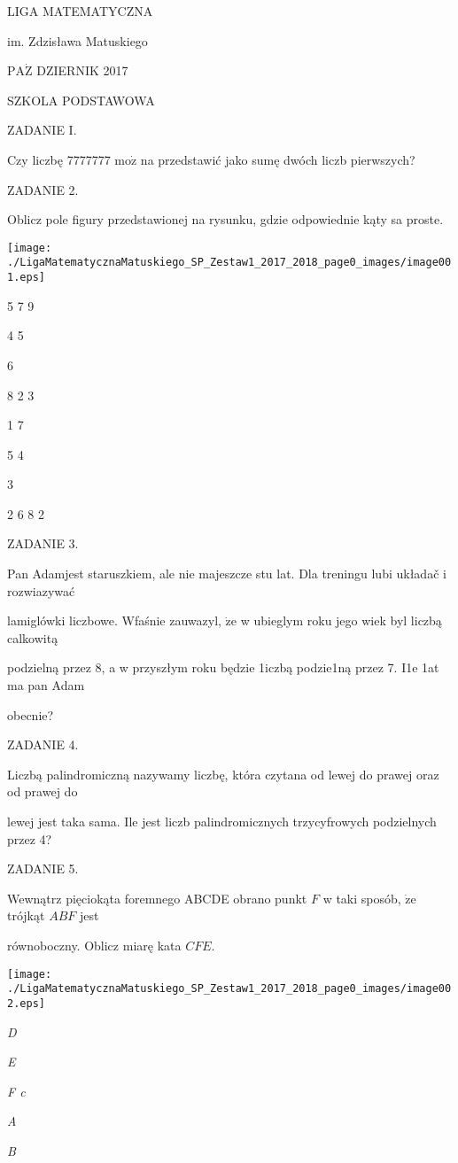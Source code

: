 \documentclass[a4paper,12pt]{article}
\begin{document}
LIGA MATEMATYCZNA

im. Zdzisława Matuskiego

$\mathrm{P}\mathrm{A}\dot{\mathrm{Z}}$ DZIERNIK 2017

SZKOLA PODSTAWOWA

ZADANIE I.

Czy liczbę 7777777 $\mathrm{m}\mathrm{o}\dot{\mathrm{z}}$ na przedstawić jako sumę dwóch liczb pierwszych?

ZADANIE 2.

Oblicz pole figury przedstawionej na rysunku, gdzie odpowiednie kąty sa proste.
\begin{center}
\texttt{[image: ./LigaMatematycznaMatuskiego\_SP\_Zestaw1\_2017\_2018\_page0\_images/image001.eps]}
\end{center}
5  7  9

4  5

6

8  2 3

1  7

5  4

3

2  6  8  2

ZADANIE 3.

Pan Adamjest staruszkiem, ale nie majeszcze stu lat. Dla treningu lubi układač i rozwiazywać

lamiglówki liczbowe. Wfaśnie zauwazyl, $\dot{\mathrm{z}}\mathrm{e}$ w ubieglym roku jego wiek byl liczbą calkowitą

podzielną przez 8, a w przyszłym roku będzie 1iczbą podzie1ną przez 7. I1e 1at ma pan Adam

obecnie?

ZADANIE 4.

Liczbą palindromiczną nazywamy liczbę, która czytana od lewej do prawej oraz od prawej do

lewej jest taka sama. Ile jest liczb palindromicznych trzycyfrowych podzielnych przez 4?

ZADANIE 5.

Wewnątrz pięciokąta foremnego ABCDE obrano punkt $F$ w taki sposób, $\dot{\mathrm{z}}\mathrm{e}$ trójkąt $ABF$ jest

równoboczny. Oblicz miarę kata $CFE.$
\begin{center}
\texttt{[image: ./LigaMatematycznaMatuskiego\_SP\_Zestaw1\_2017\_2018\_page0\_images/image002.eps]}
\end{center}
{\it D}

{\it E}

{\it F c}

{\it A}

{\it B}
\end{document}
